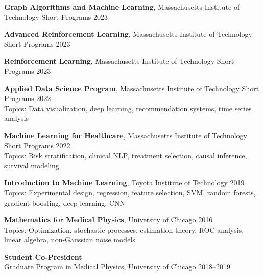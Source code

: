 \documentclass[10pt,letterpaper]{article}
\begin{document}
\begin{benumerate}{7}

\item
  \textbf{Graph Algorithms and Machine Learning}, Massachusetts Institute of Technology Short Programs \hfill 2023\\
  
\item
  \textbf{Advanced Reinforcement Learning}, Massachusetts Institute of Technology Short Programs \hfill 2023\\
  
\item
  \textbf{Reinforcement Learning}, Massachusetts Institute of Technology Short Programs \hfill 2023\\
  
\item
  \textbf{Applied Data Science Program}, Massachusetts Institute of Technology Short Programs \hfill 2022\\
  Topics: Data visualization, deep learning, recommendation systems, time series analysis
  
\item
  \textbf{Machine Learning for Healthcare}, Massachusetts Institute of Technology Short Programs \hfill 2022\\
  Topics: Risk stratification, clinical NLP, treatment selection, causal inference, survival modeling

\item  
  \textbf{Introduction to Machine Learning}, Toyota Institute of Technology \hfill 2019\\
  Topics: Experimental design, regression, feature selection, SVM, random forests, gradient boosting, deep learning, CNN

\item
  \textbf{Mathematics for Medical Physics}, University of Chicago \hfill 2016\\
  Topics: Optimization, stochastic processes, estimation theory, ROC analysis, linear algebra, non-Gaussian noise models

\end{benumerate}


\begin{benumerate}{1}
\item
  \textbf{Student Co-President}\\
  Graduate Program in Medical Physics, University of Chicago \hfill 2018--2019
\end{benumerate}
\end{document}
